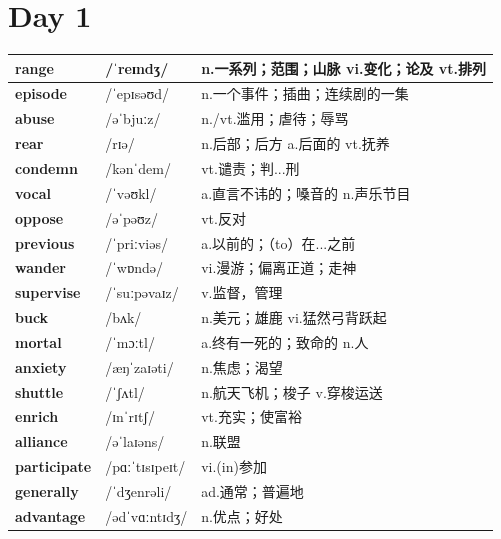 \documentclass[14pt,a4paper]{extarticle}
\begin{document}
\section{Day 1}

\begin{longtable}{ p{} p{} p{} }
\hline
\endfirsthead
\hline
\endhead
\endfoot
\endlastfoot

\textbf{range} & /ˈreɪndʒ/ & n.一系列；范围；山脉 \quad vi.变化；论及 \quad vt.排列 \\ \hline
\textbf{episode} & /ˈepɪsəʊd/ & n.一个事件；插曲；连续剧的一集 \\ \hline
\textbf{abuse} & /əˈbjuːz/ & n./vt.滥用；虐待；辱骂 \\ \hline
\textbf{rear} & /rɪə/ & n.后部；后方 \quad a.后面的 \quad vt.抚养 \\ \hline
\textbf{condemn} & /kənˈdem/ & vt.谴责；判...刑 \\ \hline
\textbf{vocal} & /ˈvəʊkl/ & a.直言不讳的；嗓音的 \quad n.声乐节目 \\ \hline
\textbf{oppose} & /əˈpəʊz/ & vt.反对 \\ \hline
\textbf{previous} & /ˈpriːviəs/ & a.以前的；（to）在...之前 \\ \hline
\textbf{wander} & /ˈwɒndə/ & vi.漫游；偏离正道；走神 \\ \hline
\textbf{supervise} & /ˈsuːpəvaɪz/ & v.监督，管理 \\ \hline
\textbf{buck} & /bʌk/ & n.美元；雄鹿 \quad vi.猛然弓背跃起 \\ \hline
\textbf{mortal} & /ˈmɔːtl/ & a.终有一死的；致命的 \quad n.人 \\ \hline
\textbf{anxiety} & /æŋˈzaɪəti/ & n.焦虑；渴望 \\ \hline
\textbf{shuttle} & /ˈʃʌtl/ & n.航天飞机；梭子 \quad v.穿梭运送 \\ \hline
\textbf{enrich} & /ɪnˈrɪtʃ/ & vt.充实；使富裕 \\ \hline
\textbf{alliance} & /əˈlaɪəns/ & n.联盟 \\ \hline
\textbf{participate} & /pɑːˈtɪsɪpeɪt/ & vi.(in)参加 \\ \hline
\textbf{generally} & /ˈdʒenrəli/ & ad.通常；普遍地 \\ \hline
\textbf{advantage} & /ədˈvɑːntɪdʒ/ & n.优点；好处 \\ \hline

\end{longtable}
\end{document}
